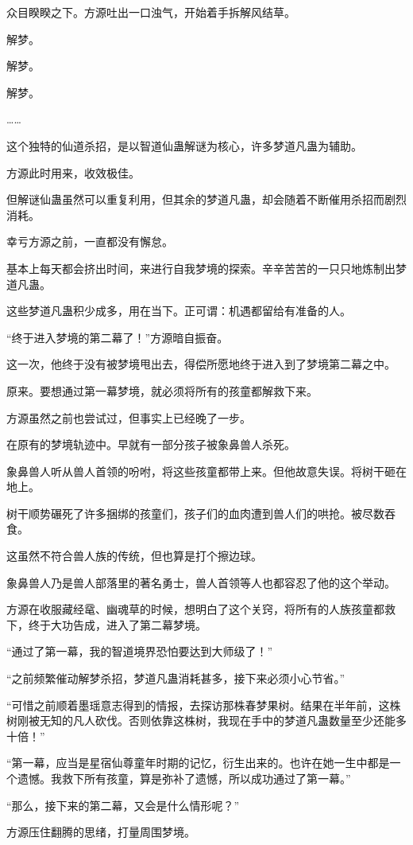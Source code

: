 \begin{this_body}
众目睽睽之下。方源吐出一口浊气，开始着手拆解风结草。

解梦。

解梦。

解梦。

……

这个独特的仙道杀招，是以智道仙蛊解谜为核心，许多梦道凡蛊为辅助。

方源此时用来，收效极佳。

但解谜仙蛊虽然可以重复利用，但其余的梦道凡蛊，却会随着不断催用杀招而剧烈消耗。

幸亏方源之前，一直都没有懈怠。

基本上每天都会挤出时间，来进行自我梦境的探索。辛辛苦苦的一只只地炼制出梦道凡蛊。

这些梦道凡蛊积少成多，用在当下。正可谓：机遇都留给有准备的人。

“终于进入梦境的第二幕了！”方源暗自振奋。

这一次，他终于没有被梦境甩出去，得偿所愿地终于进入到了梦境第二幕之中。

原来。要想通过第一幕梦境，就必须将所有的孩童都解救下来。

方源虽然之前也尝试过，但事实上已经晚了一步。

在原有的梦境轨迹中。早就有一部分孩子被象鼻兽人杀死。

象鼻兽人听从兽人首领的吩咐，将这些孩童都带上来。但他故意失误。将树干砸在地上。

树干顺势碾死了许多捆绑的孩童们，孩子们的血肉遭到兽人们的哄抢。被尽数吞食。

这虽然不符合兽人族的传统，但也算是打个擦边球。

象鼻兽人乃是兽人部落里的著名勇士，兽人首领等人也都容忍了他的这个举动。

方源在收服藏经鼋、幽魂草的时候，想明白了这个关窍，将所有的人族孩童都救下，终于大功告成，进入了第二幕梦境。

“通过了第一幕，我的智道境界恐怕要达到大师级了！”

“之前频繁催动解梦杀招，梦道凡蛊消耗甚多，接下来必须小心节省。”

“可惜之前顺着墨瑶意志得到的情报，去探访那株春梦果树。结果在半年前，这株树刚被无知的凡人砍伐。否则依靠这株树，我现在手中的梦道凡蛊数量至少还能多十倍！”

“第一幕，应当是星宿仙尊童年时期的记忆，衍生出来的。也许在她一生中都是一个遗憾。我救下所有孩童，算是弥补了遗憾，所以成功通过了第一幕。”

“那么，接下来的第二幕，又会是什么情形呢？”

方源压住翻腾的思绪，打量周围梦境。


\end{this_body}
